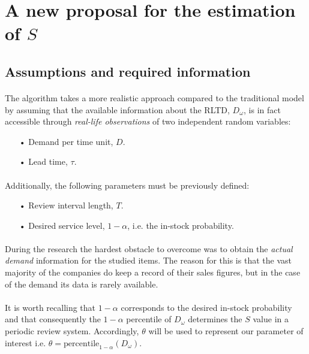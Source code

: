 \documentclass[letterpaper]{article}
\begin{document}
\FloatBarrier


\section*{A new proposal for the estimation of $S$}
\subsection*{Assumptions and required information}
\paragraph{}
The algorithm takes a more realistic approach compared to the traditional model by assuming that the available information about the RLTD, $D_\omega$, is in fact accessible through \textit{real-life observations} of two independent random variables:

\begin{itemize}
	\item[•]Demand per time unit, $D$.
	\item[•]Lead time, $\tau$.
\end{itemize}

\paragraph{}
Additionally, the following parameters must be previously defined:
\begin{itemize}
	\item[•]Review interval length, $T$.
	\item[•]Desired service level, $1-\alpha$, i.e. the in-stock probability.
\end{itemize}

\paragraph{}
During the research the hardest obstacle to overcome was to obtain the \textit{actual demand} information for the studied items. The reason for this is that the vast majority of the companies do keep a record of their sales figures, but in the case of the demand its data is rarely available. 

\paragraph{}
It is worth recalling that $1-\alpha$ corresponds to the desired in-stock probability and that consequently the $1-\alpha$ percentile of $D_\omega$ determines the $S$ value in a periodic review system. Accordingly, $\theta$ will be used to represent our parameter of interest i.e. $\theta=\mathrm{percentile}_{1-\alpha}(D_\omega)$.
\end{document}
